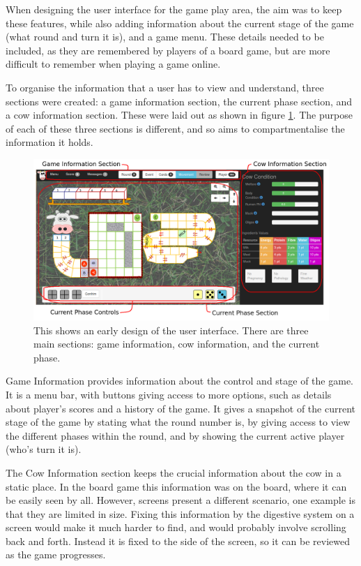 When designing the user interface for the game play area, the aim was to keep these features, while also adding information about the current stage of the game (what round and turn it is), and a game menu. These details needed to be included, as they are remembered by players of a board game, but are more difficult to remember when playing a game online.

To organise the information that a user has to view and understand, three sections were created: a game information section, the current phase section, and a cow information section. These were laid out as shown in figure \ref{2_play_sections}. The purpose of each of these three sections is different, and so aims to compartmentalise the information it holds.

\begin{figure}[ht]
\centering
\includegraphics[width=6in]{Images/2/ui-sections}
\caption{This shows an early design of the user interface. There are three main sections: game information, cow information, and the current phase.}
\label{2_play_sections}
\end{figure}

Game Information provides information about the control and stage of the game. It is a menu bar, with buttons giving access to more options, such as details about player's scores and a history of the game. It gives a snapshot of the current stage of the game by stating what the round number is, by giving access to view the different phases within the round, and by showing the current active player (who's turn it is).

The Cow Information section keeps the crucial information about the cow in a static place. In the board game this information was on the board, where it can be easily seen by all. However, screens present a different scenario, one example is that they are limited in size. Fixing this information by the digestive system on a screen would make it much harder to find, and would probably involve scrolling back and forth. Instead it is fixed to the side of the screen, so it can be reviewed as the game progresses.

